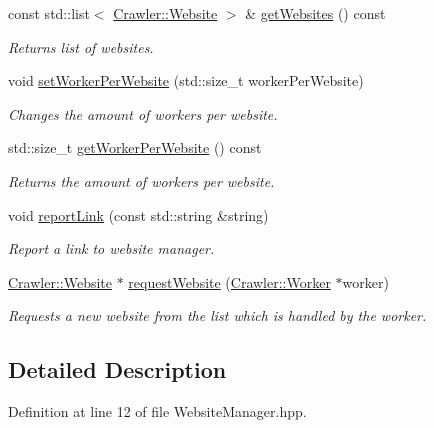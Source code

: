 \begin{DoxyCompactItemize}
const std\+::list$<$ \hyperlink{class_crawler_1_1_website}{Crawler\+::\+Website} $>$ \& \hyperlink{class_crawler_1_1_website_manager_abb40067a259c4c1cb274a30e4259e09b}{get\+Websites} () const 
\begin{DoxyCompactList}\small\item\em Returns list of websites. \end{DoxyCompactList}\item 
void \hyperlink{class_crawler_1_1_website_manager_addf1f3b0bf194c14ed1b77dd8a8eaf1b}{set\+Worker\+Per\+Website} (std\+::size\+\_\+t worker\+Per\+Website)
\begin{DoxyCompactList}\small\item\em Changes the amount of workers per website. \end{DoxyCompactList}\item 
std\+::size\+\_\+t \hyperlink{class_crawler_1_1_website_manager_a28f65de487a2006d00d44c157efbf45a}{get\+Worker\+Per\+Website} () const 
\begin{DoxyCompactList}\small\item\em Returns the amount of workers per website. \end{DoxyCompactList}\item 
void \hyperlink{class_crawler_1_1_website_manager_a2df4537dc3e42b2888491cafd463f80e}{report\+Link} (const std\+::string \&string)
\begin{DoxyCompactList}\small\item\em Report a link to website manager. \end{DoxyCompactList}\item 
\hyperlink{class_crawler_1_1_website}{Crawler\+::\+Website} $\ast$ \hyperlink{class_crawler_1_1_website_manager_a128ba5c4f12e5d445c1b786af67f2301}{request\+Website} (\hyperlink{class_crawler_1_1_worker}{Crawler\+::\+Worker} $\ast$worker)
\begin{DoxyCompactList}\small\item\em Requests a new website from the list which is handled by the worker. \end{DoxyCompactList}\end{DoxyCompactItemize}


\subsection{Detailed Description}


Definition at line 12 of file Website\+Manager.\+hpp.



